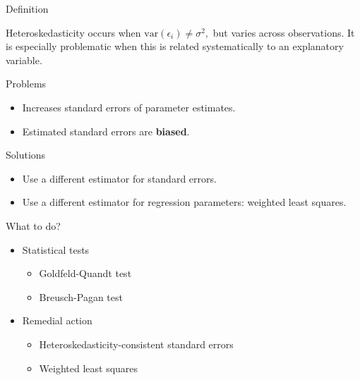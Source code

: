 \documentclass[10pt,ignorenonframetext,]{beamer}
\providecommand{\tightlist}{%
  \setlength{\itemsep}{0pt}\setlength{\parskip}{0pt}}
\begin{document}
\begin{frame}{Definition}

Heteroskedasticity occurs when
\(\mathrm{var}(\epsilon_i) \ne \sigma^2,\) but varies across
observations. It is especially problematic when this is related
systematically to an explanatory variable.

\Large Problems

\normalsize

\begin{itemize}
\tightlist
\item
  Increases standard errors of parameter estimates.
\item
  Estimated standard errors are \textbf{biased}.
\end{itemize}

\Large Solutions \normalsize

\begin{itemize}
\tightlist
\item
  Use a different estimator for standard errors.
\item
  Use a different estimator for regression parameters: weighted least
  squares.
\end{itemize}

\end{frame}

\begin{frame}{What to do?}

\begin{itemize}
\tightlist
\item
  Statistical tests

  \begin{itemize}
  \tightlist
  \item
    Goldfeld-Quandt test
  \item
    Breusch-Pagan test
  \end{itemize}
\item
  Remedial action

  \begin{itemize}
  \tightlist
  \item
    Heteroskedasticity-consistent standard errors
  \item
    Weighted least squares
  \end{itemize}
\end{itemize}

\end{frame}
\end{document}
